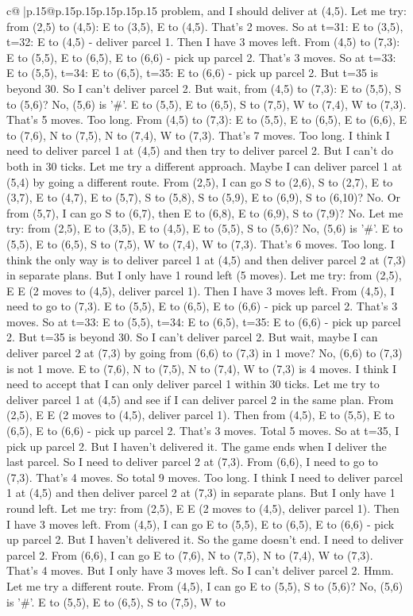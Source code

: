 \documentclass{article}
\begin{document}
{\begin{supertabular}{c@{$\;$}|p{.15\linewidth}@{}p{.15\linewidth}p{.15\linewidth}p{.15\linewidth}p{.15\linewidth}p{.15\linewidth}}
{{{problem, and I should deliver at (4,5). Let me try: from (2,5) to (4,5): E to (3,5), E to (4,5). That's 2 moves. So at t=31: E to (3,5), t=32: E to (4,5) {-} deliver parcel 1. Then I have 3 moves left. From (4,5) to (7,3): E to (5,5), E to (6,5), E to (6,6) {-} pick up parcel 2. That's 3 moves. So at t=33: E to (5,5), t=34: E to (6,5), t=35: E to (6,6) {-} pick up parcel 2. But t=35 is beyond 30. So I can't deliver parcel 2. But wait, from (4,5) to (7,3): E to (5,5), S to (5,6)? No, (5,6) is '\#'. E to (5,5), E to (6,5), S to (7,5), W to (7,4), W to (7,3). That's 5 moves. Too long. From (4,5) to (7,3): E to (5,5), E to (6,5), E to (6,6), E to (7,6), N to (7,5), N to (7,4), W to (7,3). That's 7 moves. Too long. I think I need to deliver parcel 1 at (4,5) and then try to deliver parcel 2. But I can't do both in 30 ticks. Let me try a different approach. Maybe I can deliver parcel 1 at (5,4) by going a different route. From (2,5), I can go S to (2,6), S to (2,7), E to (3,7), E to (4,7), E to (5,7), S to (5,8), S to (5,9), E to (6,9), S to (6,10)? No. Or from (5,7), I can go S to (6,7), then E to (6,8), E to (6,9), S to (7,9)? No. Let me try: from (2,5), E to (3,5), E to (4,5), E to (5,5), S to (5,6)? No, (5,6) is '\#'. E to (5,5), E to (6,5), S to (7,5), W to (7,4), W to (7,3). That's 6 moves. Too long. I think the only way is to deliver parcel 1 at (4,5) and then deliver parcel 2 at (7,3) in separate plans. But I only have 1 round left (5 moves). Let me try: from (2,5), E E (2 moves to (4,5), deliver parcel 1). Then I have 3 moves left. From (4,5), I need to go to (7,3). E to (5,5), E to (6,5), E to (6,6) {-} pick up parcel 2. That's 3 moves. So at t=33: E to (5,5), t=34: E to (6,5), t=35: E to (6,6) {-} pick up parcel 2. But t=35 is beyond 30. So I can't deliver parcel 2. But wait, maybe I can deliver parcel 2 at (7,3) by going from (6,6) to (7,3) in 1 move? No, (6,6) to (7,3) is not 1 move. E to (7,6), N to (7,5), N to (7,4), W to (7,3) is 4 moves. I think I need to accept that I can only deliver parcel 1 within 30 ticks. Let me try to deliver parcel 1 at (4,5) and see if I can deliver parcel 2 in the same plan. From (2,5), E E (2 moves to (4,5), deliver parcel 1). Then from (4,5), E to (5,5), E to (6,5), E to (6,6) {-} pick up parcel 2. That's 3 moves. Total 5 moves. So at t=35, I pick up parcel 2. But I haven't delivered it. The game ends when I deliver the last parcel. So I need to deliver parcel 2 at (7,3). From (6,6), I need to go to (7,3). That's 4 moves. So total 9 moves. Too long. I think I need to deliver parcel 1 at (4,5) and then deliver parcel 2 at (7,3) in separate plans. But I only have 1 round left. Let me try: from (2,5), E E (2 moves to (4,5), deliver parcel 1). Then I have 3 moves left. From (4,5), I can go E to (5,5), E to (6,5), E to (6,6) {-} pick up parcel 2. But I haven't delivered it. So the game doesn't end. I need to deliver parcel 2. From (6,6), I can go E to (7,6), N to (7,5), N to (7,4), W to (7,3). That's 4 moves. But I only have 3 moves left. So I can't deliver parcel 2. Hmm. Let me try a different route. From (4,5), I can go E to (5,5), S to (5,6)? No, (5,6) is '\#'. E to (5,5), E to (6,5), S to (7,5), W to }}}
\end{supertabular}}
\end{document}
